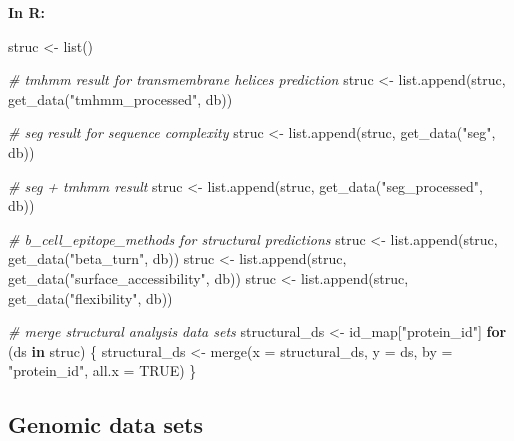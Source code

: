 \documentclass[
  11pt,
  oneside]{book}
\newenvironment{Shaded}{\begin{snugshade}}{\end{snugshade}}
\newcommand{\AttributeTok}[1]{\textcolor[rgb]{0.77,0.63,0.00}{#1}}
\newcommand{\CommentTok}[1]{\textcolor[rgb]{0.56,0.35,0.01}{\textit{#1}}}
\newcommand{\ConstantTok}[1]{\textcolor[rgb]{0.00,0.00,0.00}{#1}}
\newcommand{\ControlFlowTok}[1]{\textcolor[rgb]{0.13,0.29,0.53}{\textbf{#1}}}
\newcommand{\FunctionTok}[1]{\textcolor[rgb]{0.00,0.00,0.00}{#1}}
\newcommand{\NormalTok}[1]{#1}
\newcommand{\OtherTok}[1]{\textcolor[rgb]{0.56,0.35,0.01}{#1}}
\newcommand{\StringTok}[1]{\textcolor[rgb]{0.31,0.60,0.02}{#1}}
\begin{document}
\textbf{In R: }

\begin{Shaded}
\begin{Highlighting}[]
\NormalTok{struc }\OtherTok{\textless{}{-}} \FunctionTok{list}\NormalTok{()}

\CommentTok{\# tmhmm result for transmembrane helices prediction}
\NormalTok{struc }\OtherTok{\textless{}{-}} \FunctionTok{list.append}\NormalTok{(struc, }\FunctionTok{get\_data}\NormalTok{(}\StringTok{"tmhmm\_processed"}\NormalTok{, db))}

\CommentTok{\# seg result for sequence complexity}
\NormalTok{struc }\OtherTok{\textless{}{-}} \FunctionTok{list.append}\NormalTok{(struc, }\FunctionTok{get\_data}\NormalTok{(}\StringTok{"seg"}\NormalTok{, db))}

\CommentTok{\# seg + tmhmm result}
\NormalTok{struc }\OtherTok{\textless{}{-}} \FunctionTok{list.append}\NormalTok{(struc, }\FunctionTok{get\_data}\NormalTok{(}\StringTok{"seg\_processed"}\NormalTok{, db))}

\CommentTok{\# b\_cell\_epitope\_methods for structural predictions}
\NormalTok{struc }\OtherTok{\textless{}{-}} \FunctionTok{list.append}\NormalTok{(struc, }\FunctionTok{get\_data}\NormalTok{(}\StringTok{"beta\_turn"}\NormalTok{, db))}
\NormalTok{struc }\OtherTok{\textless{}{-}} \FunctionTok{list.append}\NormalTok{(struc, }\FunctionTok{get\_data}\NormalTok{(}\StringTok{"surface\_accessibility"}\NormalTok{, db))}
\NormalTok{struc }\OtherTok{\textless{}{-}} \FunctionTok{list.append}\NormalTok{(struc, }\FunctionTok{get\_data}\NormalTok{(}\StringTok{"flexibility"}\NormalTok{, db))}

\CommentTok{\# merge structural analysis data sets}
\NormalTok{structural\_ds }\OtherTok{\textless{}{-}}\NormalTok{ id\_map[}\StringTok{"protein\_id"}\NormalTok{]}
\ControlFlowTok{for}\NormalTok{ (ds }\ControlFlowTok{in}\NormalTok{ struc) \{}
\NormalTok{  structural\_ds }\OtherTok{\textless{}{-}} \FunctionTok{merge}\NormalTok{(}\AttributeTok{x =}\NormalTok{ structural\_ds, }\AttributeTok{y =}\NormalTok{ ds, }\AttributeTok{by =} \StringTok{"protein\_id"}\NormalTok{, }\AttributeTok{all.x =} \ConstantTok{TRUE}\NormalTok{)}
\NormalTok{\}}
\end{Highlighting}
\end{Shaded}

\hypertarget{genomic-data-sets}{%
\subsection{Genomic data sets}\label{genomic-data-sets}}
\end{document}
